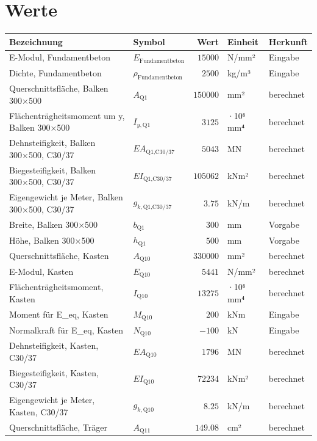 \documentclass[11pt,a4paper]{article}
\begin{document}
\section{Werte}
\begin{xltabular}{\linewidth}{>{\raggedright\arraybackslash}Xlrll}
\hline
Bezeichnung & Symbol & Wert & Einheit & Herkunft \\
\hline
\endhead
E-Modul, Fundamentbeton & $E_{\text{Fundamentbeton}}$ & $15000$ & N/mm² & Eingabe \\
Dichte, Fundamentbeton & $\rho_{\text{Fundamentbeton}}$ & $2500$ & kg/m³ & Eingabe \\
Querschnittsfläche, Balken 300×500 & $A_{\text{Q1}}$ & $150000$ & mm² & berechnet \\
Flächenträgheitsmoment um y, Balken 300×500 & $I_{y,\text{Q1}}$ & $3125$ & ·10⁶ mm⁴ & berechnet \\
Dehnsteifigkeit, Balken 300×500, C30/37 & $EA_{\text{Q1,C30/37}}$ & $5043$ & MN & berechnet \\
Biegesteifigkeit, Balken 300×500, C30/37 & $EI_{\text{Q1,C30/37}}$ & $105062$ & kNm² & berechnet \\
Eigengewicht je Meter, Balken 300×500, C30/37 & $g_{k,\text{Q1,C30/37}}$ & $3.75$ & kN/m & berechnet \\
Breite, Balken 300×500 & $b_{\text{Q1}}$ & $300$ & mm & Vorgabe \\
Höhe, Balken 300×500 & $h_{\text{Q1}}$ & $500$ & mm & Vorgabe \\
Querschnittsfläche, Kasten & $A_{\text{Q10}}$ & $330000$ & mm² & berechnet \\
E-Modul, Kasten & $E_{\text{Q10}}$ & $5441$ & N/mm² & berechnet \\
Flächenträgheitsmoment, Kasten & $I_{\text{Q10}}$ & $13275$ & ·10⁶ mm⁴ & berechnet \\
Moment für E\_eq, Kasten & $M_{\text{Q10}}$ & $200$ & kNm & Eingabe \\
Normalkraft für E\_eq, Kasten & $N_{\text{Q10}}$ & $-100$ & kN & Eingabe \\
Dehnsteifigkeit, Kasten, C30/37 & $EA_{\text{Q10}}$ & $1796$ & MN & berechnet \\
Biegesteifigkeit, Kasten, C30/37 & $EI_{\text{Q10}}$ & $72234$ & kNm² & berechnet \\
Eigengewicht je Meter, Kasten, C30/37 & $g_{k,\text{Q10}}$ & $8.25$ & kN/m & berechnet \\
Querschnittsfläche, Träger & $A_{\text{Q11}}$ & $149.08$ & cm² & berechnet \\

\end{xltabular}
\end{document}
